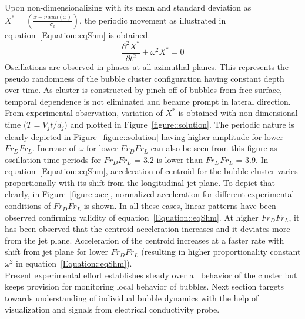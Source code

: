 Upon non-dimensionalizing with its mean and standard deviation as $ X^{*} = \left(\frac{x-mean(x)}{\sigma_{x}}\right)$, the periodic movement as illustrated in equation~\ref{Equation::eqShm} is obtained.
\begin{equation}
\frac{\partial^2 X^*}{\partial t^2} + \omega^2X^{*} = 0
\label{Equation::eqShm}
\end{equation} 
Oscillations are observed in phases at all azimuthal planes. This represents the pseudo randomness of the bubble cluster configuration having constant depth over time. As cluster is constructed by pinch off of bubbles from free surface, temporal dependence is not eliminated and became prompt in lateral direction. From experimental observation, variation of $X^*$ is obtained with non-dimensional time ($T = V_jt/d_j$) and plotted in Figure~\ref{figure::solution}.
The periodic nature is clearly depicted in Figure~\ref{figure::solution} having higher amplitude for lower $Fr_DFr_L$. Increase of $\omega$ for lower $Fr_DFr_L$ can also be seen from this figure as oscillation time periods for $Fr_DFr_L$ = 3.2 is lower than $Fr_DFr_L$ = 3.9. In equation~\ref{Equation::eqShm}, acceleration of centroid for the bubble cluster varies proportionally with its shift from the longitudinal jet plane. To depict that clearly, in Figure~\ref{figure::acc}, normalized acceleration for different experimental conditions of $Fr_DFr_L$ is shown. In all these cases, linear patterns have been observed confirming validity of equation~\ref{Equation::eqShm}. At higher $Fr_DFr_L$, it has been observed that the centroid acceleration increases and it deviates more from the jet plane. Acceleration of the centroid increases at a faster rate with shift from jet plane for lower $Fr_DFr_L$ (resulting in higher proportionality constant $ \omega^2 $ in equation~\ref{Equation::eqShm}). \\
Present experimental effort establishes steady over all behavior of the cluster but keeps provision for monitoring local behavior of bubbles. Next section targets towards understanding of individual bubble dynamics with the help of visualization and signals from electrical conductivity probe.
